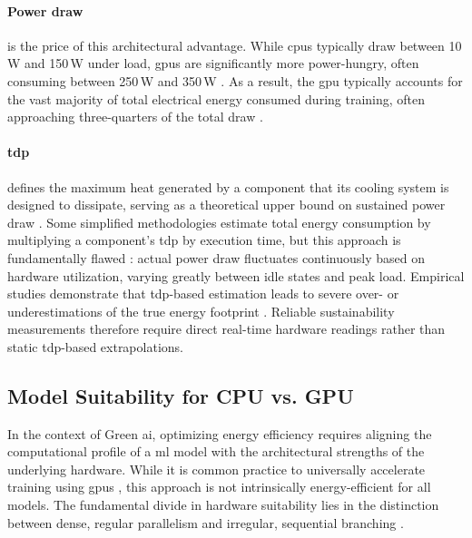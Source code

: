 \paragraph{Power draw} is the price of this architectural advantage. While \glspl{cpu} typically draw between 10\,W and 150\,W under load, \glspl{gpu} are significantly more power-hungry, often consuming between 250\,W and 350\,W \parencite{dodgeMeasuringCarbonIntensity2022}. As a result, the \gls{gpu} typically accounts for the vast majority of total electrical energy consumed during training, often approaching three-quarters of the total draw \parencite{dodgeMeasuringCarbonIntensity2022}.

\paragraph{\Gls{tdp}} defines the maximum heat generated by a component that its cooling system is designed to dissipate, serving as a theoretical upper bound on sustained power draw \parencite{rodriguezEvaluatingEnergyConsumption2024}. Some simplified methodologies estimate total energy consumption by multiplying a component's \gls{tdp} by execution time, but this approach is fundamentally flawed \parencite{hendersonSystematicReportingEnergy2020}: actual power draw fluctuates continuously based on hardware utilization, varying greatly between idle states and peak load. Empirical studies demonstrate that \gls{tdp}-based estimation leads to severe over- or underestimations of the true energy footprint \parencite{hendersonSystematicReportingEnergy2020}. Reliable sustainability measurements therefore require direct real-time hardware readings rather than static \gls{tdp}-based extrapolations.

\subsection{Model Suitability for CPU vs. GPU}
\label{sec:theoretical_cpu_vs_gpu}

In the context of Green \gls{ai}, optimizing energy efficiency requires aligning the computational profile of a \gls{ml} model with the architectural strengths of the underlying hardware. While it is common practice to universally accelerate training using \glspl{gpu} \parencite{schwartzGreenAI2020, wuSustainableAIEnvironmental2022}, this approach is not intrinsically energy-efficient for all models. The fundamental divide in hardware suitability lies in the distinction between dense, regular parallelism and irregular, sequential branching \parencite{nickollsGPUComputingEra2010}.

